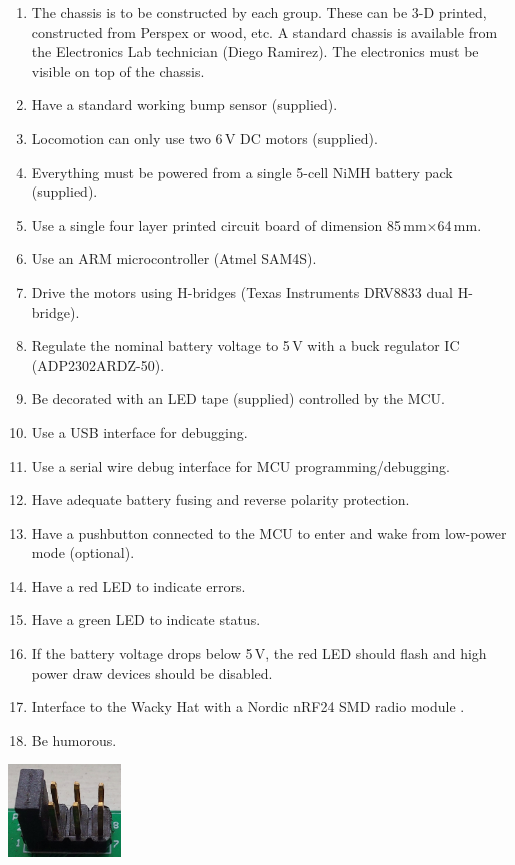\documentclass[11pt, a4paper]{article}
\begin{document}
\begin{enumerate}
\item The chassis is to be constructed by each group.  These can be 3-D printed,
  constructed from Perspex or wood, etc.  A standard chassis is available from
  the Electronics Lab technician (Diego Ramirez).  The electronics must be
  visible on top of the chassis.
\item Have a standard working bump sensor (supplied).
\item Locomotion can only use two 6\,V DC motors (supplied).
\item Everything must be powered from a single 5-cell NiMH battery pack (supplied).
\item Use a single four layer printed circuit board of dimension 85\,mm$\times$64\,mm.
\item Use an ARM microcontroller (Atmel SAM4S).
\item Drive the motors using H-bridges (Texas Instruments DRV8833 dual
  H-bridge).
\item Regulate the nominal battery voltage to 5\,V with a buck
  regulator IC (ADP2302ARDZ-50).
\item Be decorated with an LED tape (supplied) controlled by the MCU.
\item Use a USB interface for debugging.
\item Use a serial wire debug interface for MCU programming/debugging.
\item Have adequate battery fusing and reverse polarity protection.
\item Have a pushbutton connected to the MCU to enter and wake from
  low-power mode (optional).
\item Have a red LED to indicate errors.
\item Have a green LED to indicate status.
\item If the battery voltage drops below 5\,V, the red LED should flash and high power draw devices should be disabled.
\item Interface to the Wacky Hat with a Nordic nRF24 SMD radio module
.
\item Be humorous.
\end{enumerate}

\hspace{120mm}\includegraphics[width=3cm]{../guide/figs/jumpers4.jpg}
\end{document}
